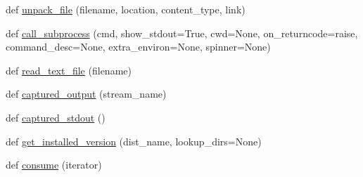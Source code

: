 \begin{DoxyCompactItemize}
def \hyperlink{namespacepip_1_1utils_a46929a9da8a55096a7474349dbf18728}{unpack\+\_\+file} (filename, location, content\+\_\+type, link)
\item 
def \hyperlink{namespacepip_1_1utils_a381bc654b1f5628e0c32cf6011d18e9a}{call\+\_\+subprocess} (cmd, show\+\_\+stdout=True, cwd=None, on\+\_\+returncode=\textquotesingle{}raise\textquotesingle{}, command\+\_\+desc=None, extra\+\_\+environ=None, spinner=None)
\item 
def \hyperlink{namespacepip_1_1utils_a0c2a582f19f830d5002708d70ebb03c7}{read\+\_\+text\+\_\+file} (filename)
\item 
def \hyperlink{namespacepip_1_1utils_a71f2e214228d8d369846d11c885d6eb6}{captured\+\_\+output} (stream\+\_\+name)
\item 
def \hyperlink{namespacepip_1_1utils_a45726d43a698bf987a189ce26d0ddedd}{captured\+\_\+stdout} ()
\item 
def \hyperlink{namespacepip_1_1utils_a69bff732d934422c963eea9cbb411a9b}{get\+\_\+installed\+\_\+version} (dist\+\_\+name, lookup\+\_\+dirs=None)
\item 
def \hyperlink{namespacepip_1_1utils_abfc0be5e29ab3edb4efc97feee05a3e0}{consume} (iterator)
\end{DoxyCompactItemize}
